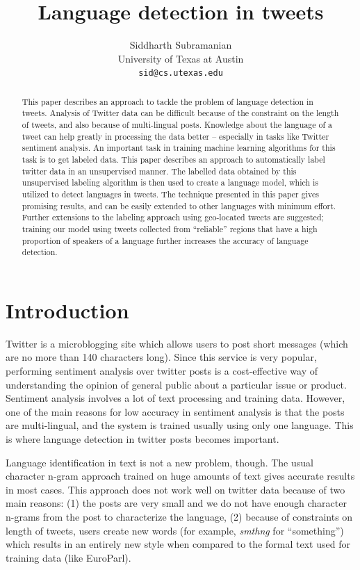 \documentclass[11pt]{article}
\title{Language detection in tweets}
\author{Siddharth Subramanian \\
  University of Texas at Austin\\
  {\tt sid@cs.utexas.edu} \\}
\date{}
\begin{document}
\maketitle
\begin{abstract}
This paper describes an approach to tackle the problem of language detection in tweets. Analysis of Twitter data can be difficult because of the constraint on the length of tweets, and also because of multi-lingual posts. Knowledge about the language of a tweet can help greatly in processing the data better -- especially in tasks like Twitter sentiment analysis. An important task in training machine learning algorithms for this task is to get labeled data. This paper describes an approach to automatically label twitter data in an unsupervised manner. The labelled data obtained by this unsupervised labeling algorithm is then used to create a language model, which is utilized to detect languages in tweets. The technique presented in this paper gives promising results, and can be easily extended to other languages with minimum effort. Further extensions to the labeling approach using geo-located tweets are suggested; training our model using tweets collected from ``reliable'' regions that have a high proportion of speakers of a language further increases the accuracy of language detection.
\end{abstract}

\section{Introduction}
Twitter is a microblogging site which allows users to post short messages (which are no more than 140 characters long). Since this service is very popular, performing sentiment analysis over twitter posts is a cost-effective way of understanding the opinion of general public about a particular issue or product. Sentiment analysis involves a lot of text processing and training data. However, one of the main reasons for low accuracy in sentiment analysis is that the posts are multi-lingual, and the system is trained usually using only one language. This is where language detection in twitter posts becomes important.

Language identification in text is not a new problem, though. The usual character n-gram approach trained on huge amounts of text gives accurate results in most cases. This approach does not work well on twitter data because of two main reasons: (1) the posts are very small and we do not have enough character n-grams from the post to characterize the language, (2) because of constraints on length of tweets, users create new words (for example, {\em smthng} for ``something'') which results in an entirely new style when compared to the formal text used for training data (like EuroParl).
\end{document}
